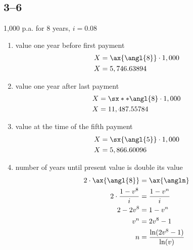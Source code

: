 \documentclass[a4paper, 12pt, reqno]{amsart}
\numberwithin{equation}{section}
\begin{document}
\subsection*{3--6}

1,000 p.a. for 8 years, $i=0.08$

\begin{enumerate}[label=(\alph*)]
    \item value one year before first payment
        \begin{equation}\nonumber
            \begin{aligned}
                X &= \ax{\angl{8}} \cdot 1,000      \\
                X &= 5,746.63894
            \end{aligned}
        \end{equation}
    \item value one year after last payment
        \begin{equation}\nonumber
            \begin{aligned}
                X &= \sx**{\angl{8}} \cdot 1,000      \\
                X &= 11,487.55784
            \end{aligned}
        \end{equation}
    \item value at the time of the fifth payment
        \begin{equation}\nonumber
            \begin{aligned}
                X &= \sx{\angl{5}} \cdot 1,000      \\
                X &= 5,866.60096
            \end{aligned}
        \end{equation}
    \item number of years until present value is double its value
        \begin{equation}\nonumber
            \begin{aligned}
                2 \cdot \ax{\angl{8}} &= \ax{\angln}            \\
                2 \cdot \frac{1 - v^8}{i} &= \frac{1-v^n}{i}    \\
                2 - 2v^8 &= 1 - v^n                             \\
                v^n &= 2v^8 - 1                                 \\
                n &= \frac{\ln(2v^8 - 1)}{\ln(v)}               \\

\end{aligned}
\end{equation}
\end{enumerate}
\end{document}
